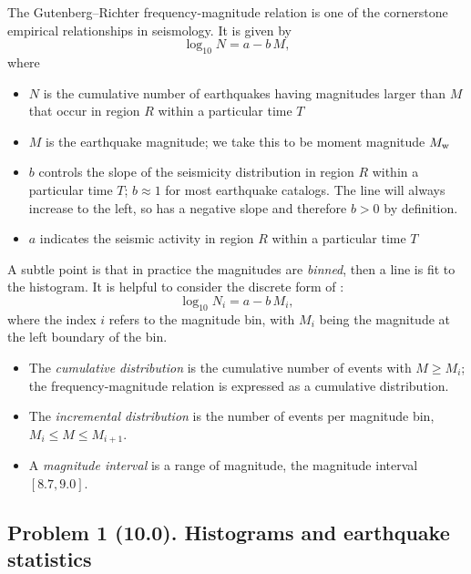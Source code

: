 \documentclass[11pt,titlepage,fleqn]{article}
\begin{document}
The Gutenberg--Richter frequency-magnitude relation \citep{GutenbergRichter1944} is one of the cornerstone empirical relationships in seismology. It is given by
%
\begin{equation}
\log_{10} N = a - b\,M,
\label{GR}
\end{equation}
%
where
%
\begin{itemize}
\item $N$ is the cumulative number of earthquakes having magnitudes larger than $M$ that occur in region $R$ within a particular time $T$
\item $M$ is the earthquake magnitude; we take this to be moment magnitude $M_{\rm w}$
\item $b$ controls the slope of the seismicity distribution in region $R$ within a particular time $T$; $b \approx 1$ for most earthquake catalogs. The line will always increase to the left, so  has a negative slope and therefore $b > 0$ by definition.
\item $a$ indicates the seismic activity in region $R$ within a particular time $T$
\end{itemize}
%
A subtle point is that in practice the magnitudes are {\em binned}, then a line is fit to the histogram. It is helpful to consider the discrete form of :
%
\begin{equation}
\log_{10} N_i = a - b\,M_i,
\label{GRd}
\end{equation}
%
where the index $i$ refers to the magnitude bin, with $M_i$ being the magnitude at the left boundary of the bin.

\begin{itemize}
\item The {\em cumulative distribution} is the cumulative number of events with $M \ge M_i$; the frequency-magnitude relation is expressed as a cumulative distribution.
\item The {\em incremental distribution} is the number of events per magnitude bin, $M_i \le M \le M_{i+1}$.
\item A {\em magnitude interval} is a range of magnitude, \eg the magnitude interval $[8.7,9.0]$.
\end{itemize}



\pagebreak
\subsection*{Problem 1 (10.0). Histograms and earthquake statistics}
\end{document}
